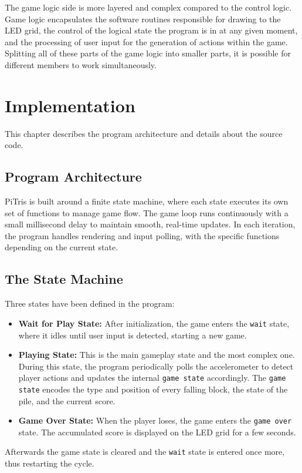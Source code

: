 \documentclass[12pt]{report}
\begin{document}
The game logic side is more layered and complex compared to the control logic. Game logic encapsulates the software routines responsible for drawing to the LED grid, the control of the logical state the program is in at any given moment, and the processing of user input for the generation of actions within the game. Splitting all of these parts of the game logic into smaller parts, it is possible for different members to work simultaneously.



\chapter{Implementation}
This chapter describes the program architecture and details about the source code.

\section{Program Architecture}
PiTris is built around a finite state machine, where each state executes its own set of functions to manage game flow. The game loop runs continuously with a small millisecond delay to maintain smooth, real-time updates. In each iteration, the program handles rendering and input polling, with the specific functions depending on the current state.

\section{The State Machine}
Three states have been defined in the program: 
\begin{itemize}
    \item \textbf{Wait for Play State:} After initialization, the game enters the \texttt{wait} state, where it idles until user input is detected, starting a new game.
    
    \item \textbf{Playing State:} This is the main gameplay state and the most complex one. During this state, the program periodically polls the accelerometer to detect player actions and updates the internal \texttt{game state} accordingly. The \texttt{game state} encodes the type and position of every falling block, the state of the pile, and the current score.
    
    \item \textbf{Game Over State:} When the player loses, the game enters the \texttt{game over} state. The accumulated score is displayed on the LED grid for a few seconds. 
\end{itemize}
 Afterwards the game state is cleared and the \texttt{wait} state is entered once more, thus restarting the cycle.
\end{document}
